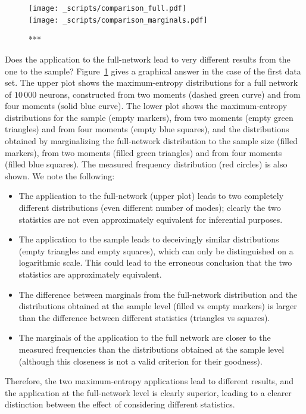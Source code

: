 \documentclass[\ifafour a4paper,12pt,\else a5paper,10pt,\fi%
onecolumn,oneside,article,%
british%
]{memoir}
\theoremstyle{remark}
\theoremstyle{innote}
\renewcommand*{\|}{\nonscript\,\vert\nonscript\;\mathopen{}}
\begin{document}
\begin{figure}[!p]
\centering
\texttt{[image: \_scripts/comparison\_full.pdf]}%
\\[3em]%
\texttt{[image: \_scripts/comparison\_marginals.pdf]}%
\caption{***}
\label{fig:comparisons_marginals}
\end{figure}
Does the application to the full-network lead to very different results
from the one to the sample? Figure~\ref{fig:comparisons_marginals} gives a
graphical answer in the case of the first data set. The upper plot shows
the maximum-entropy distributions for a full network of $10\,000$ neurons,
constructed from two moments (\textcolor{mygreen}{dashed green curve}) and
from four moments (\textcolor{myblue}{solid blue curve}). The lower plot
shows the maximum-entropy distributions for the sample (empty markers),
from two moments (\textcolor{mygreen}{empty green triangles}) and from four
moments (\textcolor{myblue}{empty blue squares}), and the distributions
obtained by marginalizing the full-network distribution to the sample size
(filled markers), from two moments (\textcolor{mygreen}{filled green
  triangles}) and from four moments (\textcolor{myblue}{filled blue
  squares}). The measured frequency distribution (\textcolor{myred}{red
  circles}) is also shown. We note the following:
\begin{itemize}
\item The application to the full-network (upper plot) leads to two
  completely different distributions (even different number of modes);
  clearly the two statistics are not even approximately equivalent for
  inferential purposes.
\item The application to the sample leads to deceivingly similar
  distributions (empty triangles and empty squares), which can only be
  distinguished on a logarithmic scale. This could lead to the erroneous
  conclusion that the two statistics are approximately equivalent.
\item The difference between marginals from the full-network distribution
  and the distributions obtained at the sample level (filled vs empty
  markers) is larger than the difference between different statistics
  (triangles vs squares).
\item The marginals of the application to the full network are closer to
  the measured frequencies than the distributions obtained at the sample
  level (although this closeness is not a valid criterion for their
  goodness).
\end{itemize}
Therefore, the two maximum-entropy applications lead to different results,
and the application at the full-network level is clearly superior, leading
to a clearer distinction between the effect of considering different
statistics.
\end{document}
